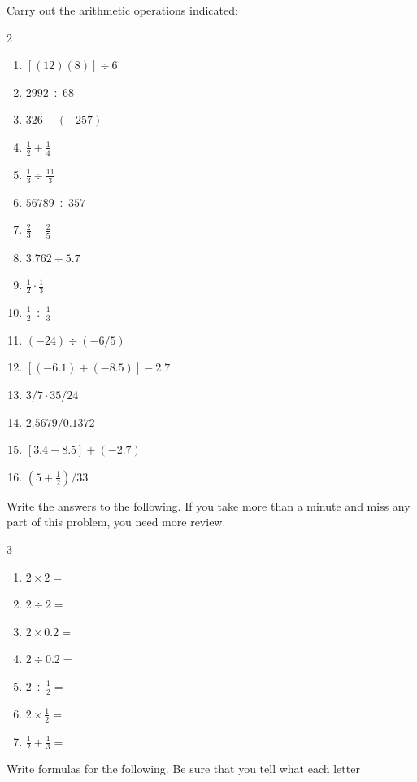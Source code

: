 \documentclass[11pt]{book}
\theoremstyle{bkplain}
\theoremstyle{XIplainnote}
\theoremstyle{bkplain}
\theoremstyle{bkplain}
\begin{document}
\begin{exlist}
\item Carry out the arithmetic operations indicated:
  \begin{multicols}{2}
  \begin{enumerate}[label=(\alph*), leftmargin=2.2em, itemsep=1pt, topsep=2pt]
  \item $[(12)(8)] \div 6$
  \item $2992 \div 68$
  \item $326 + (-257)$
  \item $\frac{1}{2} + \frac{1}{4}$
  \item $\frac{1}{3} \div \frac{11}{3}$
  \item $56789 \div 357$
  \item $\frac{2}{3} - \frac{2}{5}$
  \item $3.762 \div 5.7$
  \item $\frac{1}{2} \cdot \frac{1}{3}$
  \item $\frac{1}{2} \div \frac{1}{3}$
  \item $(-24) \div (-6/5)$
  \item $[(-6.1) + (-8.5)] - 2.7$
  \item $3/7 \cdot 35/24$
  \item $2.5679/0.1372$
  \item $[3.4 - 8.5] + (-2.7)$
  \item $(5 + \frac{1}{2})/33$
  \end{enumerate}
  \end{multicols}
\item Write the answers to the following. If you take more than a minute and miss
      any part of this problem, you need more review.
  \begin{multicols}{3}
  \begin{enumerate}[label=(\alph*), leftmargin=2.2em, itemsep=1pt, topsep=2pt]
  \item $2 \times 2 =$
  \item $2 \div 2 =$
  \item $2 \times 0.2 =$
  \item $2 \div 0.2 =$
  \item $2 \div \frac{1}{2} =$
  \item $2 \times \frac{1}{2} =$
  \item $\frac{1}{2} + \frac{1}{3} =$
  \end{enumerate}
  \end{multicols}
\item Write formulas for the following. Be sure that you tell what each letter

\end{exlist}
\end{document}
